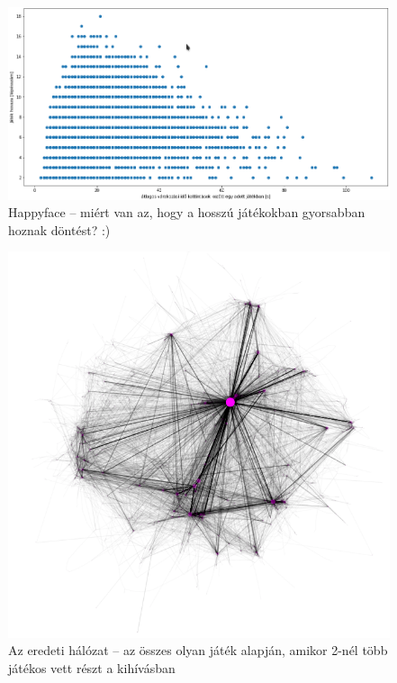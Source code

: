 \documentclass[fleqn,10pt]{wlscirep}
\begin{document}
\begin{figure}[H]
\centering
\includegraphics[width=\linewidth]{figs/fig2.png}
\caption{Happyface -- miért van az, hogy a hosszú játékokban gyorsabban hoznak döntést? :)}
\label{fig:user_avg_stats}
\end{figure}


\begin{figure}[H]
\centering
\includegraphics[width=\linewidth]{figs/sca_1.png}
\caption{Az eredeti hálózat -- az összes olyan játék alapján, amikor 2-nél több játékos vett részt a kihívásban}
\label{fig:original}
\end{figure}
\end{document}
